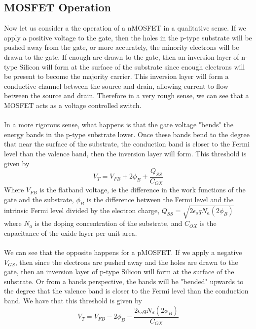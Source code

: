 \documentclass[
  reprint,
  amsmath,amssymb,
  aps
]{revtex4-1}
\begin{document}
\subsection{\label{sec:level2}MOSFET Operation}
Now let us consider a the operation of a nMOSFET in a qualitative sense. If we apply a positive voltage to the gate, then 
the holes in the p-type substrate will be pushed away from the gate, or more accurately, the minority electrons will be drawn 
to the gate. If enough are drawn to the gate, then an inversion layer of n-type Silicon will form at the surface of the substrate since 
enough electrons will be present to become the majority carrier. This inversion layer will form a conductive channel between the source and drain, 
allowing current to flow between the source and drain. Therefore in a very rough sense, we can see that a MOSFET acts 
as a voltage controlled switch.\\\\
In a more rigorous sense, what happens is that the gate voltage "bends" the energy bands in the p-type substrate lower. 
Once these bands bend to the degree that near the surface of the substrate, the conduction band is closer to the 
Fermi level than the valence band, then the inversion layer will form. This threshold is given by \cite{ChenmingHu5}
\begin{equation}
    V_{T} = V_{FB} + 2\phi_{B} + \frac{Q_{SS}}{C_{OX}}
    \label{eq:threshold_nMOSFET}
\end{equation}
Where $V_{FB}$ is the flatband voltage, ie the difference in the work functions of the gate and the substrate, $\phi_{B}$ is the 
difference between the Fermi level and the intrinsic Fermi level divided by the electron charge, $Q_{SS}=\sqrt{2\epsilon_{s}qN_{a}(2\phi_{B})}$ where 
$N_a$ is the doping concentration of the substrate, and $C_{OX}$ is the capacitance of the oxide layer per unit area.\\\\
We can see that the opposite happens for a pMOSFET. If we apply a negative $V_{GS}$, then since the electrons are pushed 
away and the holes are drawn to the gate, then an inversion layer of p-type Silicon will form at the surface of the substrate. Or 
from a bands perspective, the bands will be "bended" upwards to the degree that the valence band is closer to the Fermi level than the
conduction band. We have that this threshold is given by \cite{ChenmingHu5}
\begin{equation}
    V_{T} = V_{FB} - 2\phi_{B} - \frac{2\epsilon_{s}qN_{d}(2\phi_{B})}{C_{OX}}
    \label{eq:threshold_pMOSFET}
\end{equation}
\end{document}
